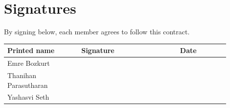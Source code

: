 \documentclass[12pt]{article}
\begin{document}
\begin{minipage}{\linewidth}
\section{Signatures}
By signing below, each member agrees to follow this contract.

\vspace{0.5em}
\renewcommand{\arraystretch}{1}
\begin{tabular}{|>{\raggedright\arraybackslash}m{0.30\linewidth}|m{0.40\linewidth}|m{0.20\linewidth}|}
  \hline
  \textbf{Printed name} & \textbf{Signature} & \textbf{Date} \\ \hline
  \rule{0pt}{2.4em}Emre Bozkurt          & & \\ \hline
  \rule{0pt}{2.4em}Thanihan Parasutharan & & \\ \hline
  \rule{0pt}{2.4em}Yashasvi Seth         & & \\ \hline
\end{tabular}
\end{minipage}
\end{document}
